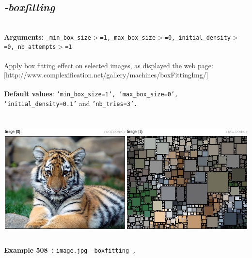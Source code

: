 \documentclass[a4paper,11pt,twoside]{book}
\begin{document}
\subsection{\emph{-boxfitting} }\vspace*{-0.5em}
~\\\textbf{Arguments: } 
{\small \texttt{\_min\_box\_size$>$=1,\_max\_box\_size$>$=0,\_initial\_density$>$=0,\_nb\_attempts$>$=1}}\\~\\
Apply box fitting effect on selected images, as displayed the web page:
[http://www.complexification.net/gallery/machines/boxFittingImg/]
~\\~\\\textbf{Default values}: {\small \texttt{'min\_box\_size=1', 'max\_box\_size=0', 'initial\_density=0.1'} and \texttt{'nb\_tries=3'.}}
\begin{center}\includegraphics[keepaspectratio=true,height=7cm,width=\textwidth]{img/gmic_def508.jpg}\\
{\footnotesize \textbf{Example 508~:} \texttt{image.jpg --boxfitting ,}}
\end{center}
\end{document}
